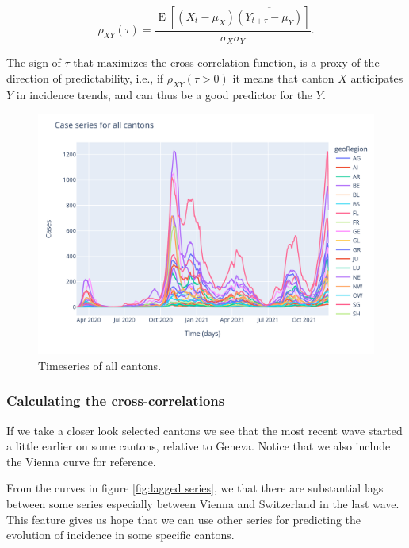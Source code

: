 \documentclass[11pt]{article}
\begin{document}
\[\rho_{XY}(\tau)={\frac {\operatorname{E} \left[\left(X_{t}-\mu _{X}\right){\overline {\left(Y_{t+\tau }-\mu _{Y}\right)}}\right]}{\sigma _{X}\sigma _{Y}}}.\]

The sign of \(\tau\) that maximizes the cross-correlation function, is a
proxy of the direction of predictability, i.e., if \(\rho_{XY}(\tau>0)\)
it means that canton \(X\) anticipates \(Y\) in incidence trends, and
can thus be a good predictor for the \(Y\).

\begin{figure}
 \centering
 \includegraphics[width=\linewidth]{canton_series.png}
 \caption{Timeseries of all cantons.}
 \label{fig:canton_series}
\end{figure}

    
    
    \hypertarget{calculating-the-cross-correlations}{%
\subsubsection{Calculating the
cross-correlations}\label{calculating-the-cross-correlations}}

If we take a closer look selected cantons we see that the most recent
wave started a little earlier on some cantons, relative to Geneva.
Notice that we also include the Vienna curve for reference.

From the curves in figure \ref{fig:lagged series}, we that there are substantial lags between some series especially between Vienna and Switzerland in the last wave. This feature gives us hope that we can use other series for predicting the evolution of incidence in some specific cantons.
\end{document}
